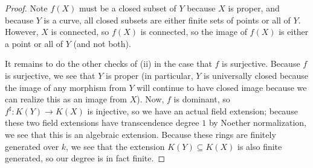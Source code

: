 \documentclass[../notes.tex]{subfiles}
\begin{document}
\begin{proof}
	Note $f(X)$ must be a closed subset of $Y$ because $X$ is proper, and because $Y$ is a curve, all closed subsets are either finite sets of points or all of $Y$. However, $X$ is connected, so $f(X)$ is connected, so the image of $f(X)$ is either a point or all of $Y$ (and not both).

	It remains to do the other checks of (ii) in the case that $f$ is surjective. Because $f$ is surjective, we see that $Y$ is proper (in particular, $Y$ is universally closed because the image of any morphism from $Y$ will continue to have closed image because we can realize this as an image from $X$). Now, $f$ is dominant, so $f^\sharp\colon K(Y)\to K(X)$ is injective, so we have an actual field extension; because these two field extensions have transcendence degree $1$ by Noether normalization, we see that this is an algebraic extension. Because these rings are finitely generated over $k$, we see that the extension $K(Y)\subseteq K(X)$ is also finite generated, so our degree is in fact finite.


\end{proof}
\end{document}
